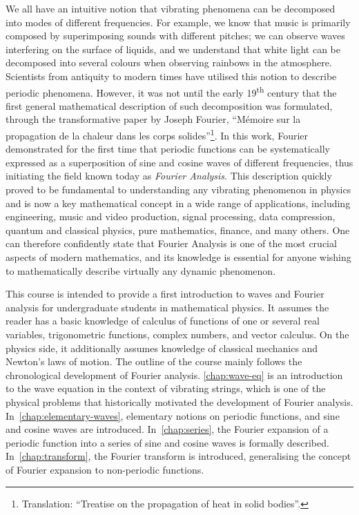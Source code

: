 We all have an intuitive notion that vibrating phenomena can be decomposed into modes of
different frequencies. For example, we know that music is primarily composed by
superimposing sounds with different pitches; we can observe waves interfering on the
surface of liquids, and we understand that white light can be decomposed into several
colours when observing rainbows in the atmosphere. Scientists from antiquity to modern
times have utilised this notion to describe periodic phenomena. However, it was not until
the early 19\textsuperscript{th} century that the first general mathematical description
of such decomposition was formulated, through the transformative paper by Joseph Fourier,
``Mémoire sur la propagation de la chaleur dans les corps solides''\footnote{Translation:
``Treatise on the propagation of heat in solid bodies''.}. In this work, Fourier
demonstrated for the first time that periodic functions can be systematically expressed as
a superposition of sine and cosine waves of different frequencies, thus initiating the
field known today as \emph{Fourier Analysis}. This description quickly proved to be
fundamental to understanding any vibrating phenomenon in physics and is now a key
mathematical concept in a wide range of applications, including engineering, music and
video production, signal processing, data compression, quantum and classical physics, pure
mathematics, finance, and many others. One can therefore confidently state that Fourier
Analysis is one of the most crucial aspects of modern mathematics, and its knowledge is
essential for anyone wishing to mathematically describe virtually any dynamic phenomenon.

This course is intended to provide a first introduction to waves and Fourier analysis for
undergraduate students in mathematical physics. It assumes the reader has a basic
knowledge of calculus of functions of one or several real variables, trigonometric
functions, complex numbers, and vector calculus. On the physics side, it additionally
assumes knowledge of classical mechanics and Newton's laws of motion. The outline of the
course mainly follows the chronological development of Fourier analysis.
\cref{chap:wave-eq} is an introduction to the wave equation in the context of vibrating
strings, which is one of the physical problems that historically motivated the development
of Fourier analysis. In~\cref{chap:elementary-waves}, elementary notions on periodic
functions, and sine and cosine waves are introduced. In~\cref{chap:series}, the Fourier
expansion of a periodic function into a series of sine and cosine waves is formally
described. In~\cref{chap:transform}, the Fourier transform is introduced, generalising the
concept of Fourier expansion to non-periodic functions.